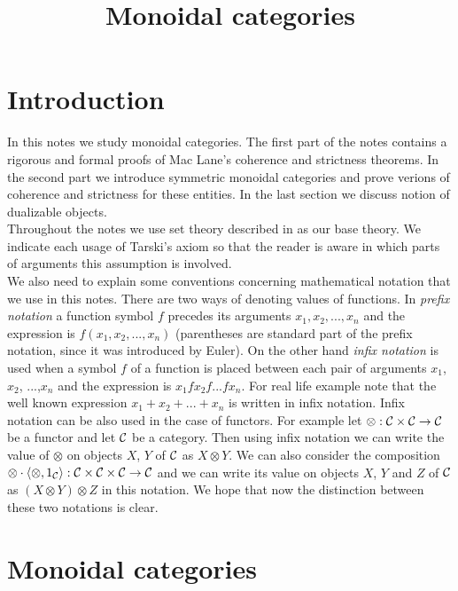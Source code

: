 



\title{Monoidal categories}
\date{}
\maketitle

\section{Introduction}
\noindent
In this notes we study monoidal categories. The first part of the notes contains a rigorous and formal proofs of Mac Lane's coherence and strictness theorems. In the second part we introduce symmetric monoidal categories and prove verions of coherence and strictness for these entities. In the last section we discuss notion of dualizable objects.\\
Throughout the notes we use set theory described in {\cite[Introduction]{Presheaves}} as our base theory. We indicate each usage of Tarski's axiom so that the reader is aware in which parts of arguments this assumption is involved.\\
We also need to explain some conventions concerning mathematical notation that we use in this notes. There are two ways of denoting values of functions. In \textit{prefix notation} a function symbol $f$ precedes its arguments $x_1,x_2,...,x_n$ and the expression is $f(x_1,x_2,...,x_n)$ (parentheses are standard part of the prefix notation, since it was introduced by Euler). On the other hand \textit{infix notation} is used when a symbol $f$ of a function is placed between each pair of arguments $x_1$, $x_2$, ...,$x_n$ and the expression is $x_1 f x_2 f...fx_n$. For real life example note that the well known expression $x_1+x_2+...+x_n$ is written in infix notation. Infix notation can be also used in the case of functors. For example let $\otimes:{\mathcal C}\times {\mathcal C}\rightarrow {\mathcal C}$ be a functor and let ${\mathcal C}$ be a category. Then using infix notation we can write the value of $\otimes$ on objects $X$, $Y$ of ${\mathcal C}$ as $X\otimes Y$. We can also consider the composition $\otimes\cdot \langle \otimes, 1_{{\mathcal C}}\rangle:{\mathcal C}\times {\mathcal C}\times {\mathcal C}\rightarrow {\mathcal C}$ and we can write its value on objects $X$, $Y$ and $Z$ of ${\mathcal C}$ as $(X\otimes Y)\otimes Z$ in this notation. We hope that now the distinction between these two notations is clear.

\section{Monoidal categories}

